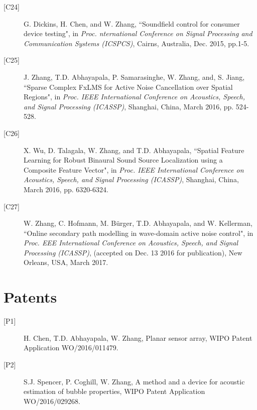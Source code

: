 \documentclass[10pt]{article}
\begin{document}
\begin{description}
\item[{[}C24{]}]G. Dickins, H. Chen, and W. Zhang, ``Soundfield control for consumer device testing", in {\em Proc. nternational Conference on Signal Processing and Communication Systems (ICSPCS)}, Cairns, Australia, Dec. 2015, pp.1-5.

\item[{[}C25{]}]J. Zhang, T.D. Abhayapala, P. Samarasinghe, W. Zhang, and, S. Jiang, ``Sparse Complex FxLMS for Active Noise Cancellation over Spatial Regions", in {\em Proc. IEEE International Conference on Acoustics, Speech, and Signal Processing (ICASSP)},  Shanghai, China, March 2016, pp. 524-528.

\item[{[}C26{]}]X. Wu, D. Talagala, W. Zhang, and T.D. Abhayapala, ``Spatial Feature Learning for Robust Binaural Sound Source Localization using a Composite Feature Vector", in {\em Proc. IEEE International Conference on Acoustics, Speech, and Signal Processing (ICASSP)},  Shanghai, China, March 2016, pp. 6320-6324.

\item[{[}C27{]}]W. Zhang, C. Hofmann, M. B\"urger, T.D. Abhayapala, and W. Kellerman, ``Online secondary path modelling in wave-domain active noise control", in {\em Proc. EEE International Conference on Acoustics, Speech, and Signal Processing (ICASSP)}, (accepted on Dec. 13 2016 for publication), New Orleans, USA, March 2017.

\vspace{-4mm}
\end{description}


\section*{Patents}
\vspace{-1mm}
\begin{description}

\item[{[}P1{]}]H. Chen, T.D. Abhayapala, W. Zhang, Planar sensor array, WIPO Patent Application WO/2016/011479.
 
\item[{[}P2{]}]S.J. Spencer, P. Coghill, W. Zhang, A method and a device for acoustic estimation of bubble properties, WIPO Patent Application WO/2016/029268.

\vspace{-4mm}
\end{description}
\end{document}
